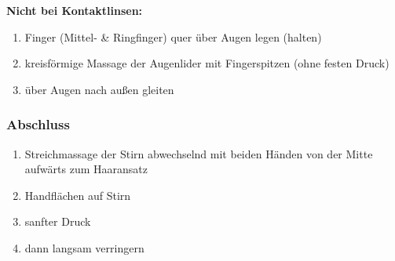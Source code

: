 \textbf{Nicht bei Kontaktlinsen:}
\begin{enumerate}
\item Finger (Mittel- \& Ringfinger) quer über Augen legen (halten)
\item kreisförmige Massage der Augenlider mit Fingerspitzen (ohne festen Druck)
\item über Augen nach außen gleiten
\end{enumerate}

\subsubsection{Abschluss}
\begin{enumerate}
\item Streichmassage der Stirn abwechselnd mit beiden Händen von der Mitte aufwärts zum Haaransatz
\item Handflächen auf Stirn
\item sanfter Druck
\item dann langsam verringern
\end{enumerate}
